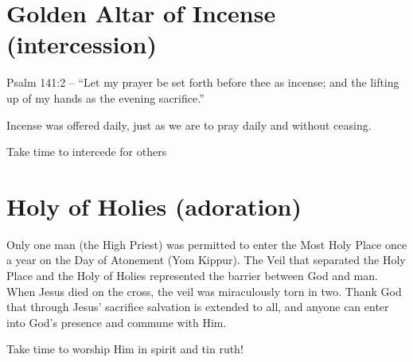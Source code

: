 \section{Golden Altar of Incense (intercession)}

Psalm 141:2 – “Let my prayer be set forth before thee as incense; and the lifting up of my hands as the evening sacrifice.”

Incense was offered daily, just as we are to pray daily and without ceasing.

Take time to intercede for others


\section{Holy of Holies (adoration)}

Only one man (the High Priest) was permitted to enter the Most Holy Place once a year on the Day of Atonement (Yom Kippur). The Veil that separated the Holy Place and the Holy of Holies represented the barrier between God and man. When Jesus died on the cross, the veil was miraculously torn in two. Thank God that through Jesus' sacrifice salvation is extended to all, and anyone can enter into God’s presence and commune with Him.

Take time to worship Him in spirit and tin ruth! 
